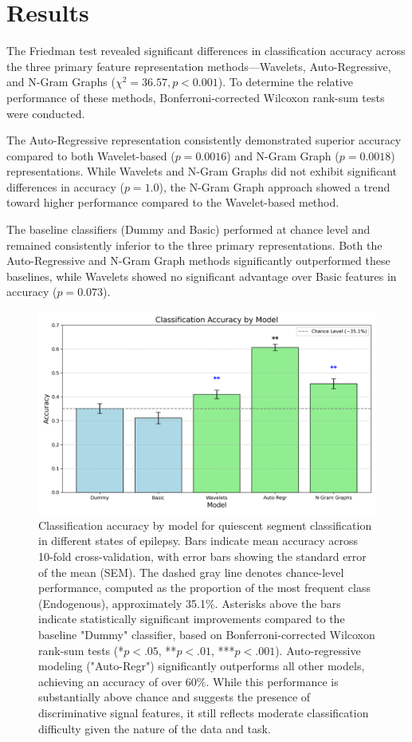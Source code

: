 \documentclass{article}
\begin{document}
\section{Results}
The Friedman test revealed significant differences in classification accuracy across the three primary feature representation methods—Wavelets, Auto-Regressive, and N-Gram Graphs (\(
\chi^2 = 36.57, p < 0.001
\)).
To determine the relative performance of these methods, Bonferroni-corrected Wilcoxon rank-sum tests were conducted.

The Auto-Regressive representation consistently demonstrated superior accuracy compared to both Wavelet-based (\(
p = 0.0016
\))
and N-Gram Graph (\(
p = 0.0018
\))
representations. While Wavelets and N-Gram Graphs did not exhibit significant differences in accuracy (\(
p = 1.0
\)),
the N-Gram Graph approach showed a trend toward higher performance compared to the Wavelet-based method.

The baseline classifiers (Dummy and Basic) performed at chance level and remained consistently inferior to the three primary representations. Both the Auto-Regressive and N-Gram Graph methods significantly outperformed these baselines, while Wavelets showed no significant advantage over Basic features in accuracy (\(
p = 0.073
\)).

\begin{figure}[htbp]
    \centering
    \includegraphics[width=\linewidth]{barplot_accuracies.png}
    \caption[Classification accuracy across representation models]{Classification accuracy by model for quiescent segment classification in different states of epilepsy. Bars indicate mean accuracy across 10-fold cross-validation, with error bars showing the standard error of the mean (SEM). The dashed gray line denotes chance-level performance, computed as the proportion of the most frequent class (Endogenous), approximately 35.1\%. Asterisks above the bars indicate statistically significant improvements compared to the baseline "Dummy" classifier, based on Bonferroni-corrected Wilcoxon rank-sum tests (*$p < .05$, **$p < .01$, ***$p < .001$). Auto-regressive modeling ("Auto-Regr") significantly outperforms all other models, achieving an accuracy of over 60\%. While this performance is substantially above chance and suggests the presence of discriminative signal features, it still reflects moderate classification difficulty given the nature of the data and task.}
    \label{fig:accuracies}
\end{figure}
\end{document}
